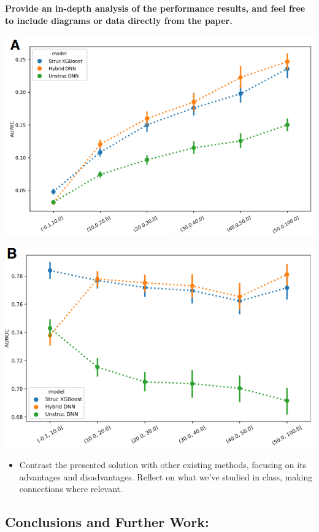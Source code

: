 \documentclass[
  letterpaper,
  DIV=11,
  numbers=noendperiod]{scrartcl}
\providecommand{\tightlist}{%
  \setlength{\itemsep}{0pt}\setlength{\parskip}{0pt}}\usepackage{longtable,booktabs,array}
\begin{document}
\textbf{Provide an in-depth analysis of the performance results, and
feel free to include diagrams or data directly from the paper.}

\includegraphics[width=5.34375in,height=\textheight]{images/paste-3.png}

\includegraphics[width=5.34375in,height=\textheight]{images/paste-4.png}

\begin{itemize}
\tightlist
\item
  Contrast the presented solution with other existing methods, focusing
  on its advantages and disadvantages. Reflect on what we've studied in
  class, making connections where relevant.
\end{itemize}

\subsection{\texorpdfstring{\textbf{Conclusions and Further
Work:}}{Conclusions and Further Work:}}\label{conclusions-and-further-work}
\end{document}
